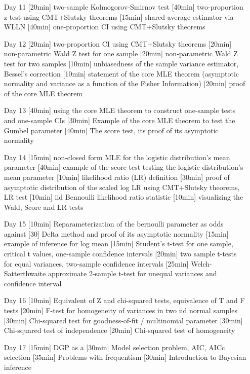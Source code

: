 \begin{enumerate}
\item[Day 11] [20min] two-sample Kolmogorov-Smirnov test [40min] two-proportion z-test using CMT+Slutsky theorems [15min] shared average estimator via WLLN [40min] one-proportion CI using CMT+Slutsky theorems

\item[Day 12] [20min] two-proportion CI using CMT+Slutsky theorems [20min] non-parametric Wald Z test for one sample [20min] non-parametric Wald Z test for two samples [10min] unbiasedness of the sample variance estimator, Bessel's correction [10min] statement of the core MLE theorem (asymptotic normality and variance as a function of the Fisher Information) [20min] proof of the core MLE theorem

\item[Day 13] [40min] using the core MLE theorem to construct one-sample tests and one-sample CIs [30min] Example of the core MLE theorem to test the Gumbel parameter [40min] The score test, its proof of its asymptotic normality 

\item[Day 14] [15min] non-closed form MLE for the logistic distribution's mean parameter [40min] example of the score test testing the logistic distribution's mean parameter [10min] likelihood ratio (LR) definition [30min] proof of asymptotic distribution of the scaled log LR using CMT+Slutsky theorems, LR test [10min] iid Bennoulli likelihood ratio statistic [10min] visualizing the Wald, Score and LR tests

\item[Day 15] [10min] Reparameterization of the bernoulli parameter as odds against [30] Delta method and proof of its asymptotic normality [15min] example of inference for log mean [15min] Student's t-test for one sample, critical t values, one-sample confidence intervals [20min] two sample t-tests for equal variances, two-sample confidence intervals [25min] Welch-Satterthwaite approximate 2-sample t-test for unequal variances and confidence interval

\item[Day 16] [10min] Equivalent of Z and chi-squared tests, equivalence of T and F tests [20min] F-test for homogeneity of variances in two iid normal samples [30min] Chi-squared test for goodness-of-fit / multinomial parameter [30min] Chi-squared test of independence [20min] Chi-squared test of homogeneity

\item[Day 17] [15min] DGP as a  [30min] Model selection problem, AIC, AICc selection [35min] Problems with frequentism [30min] Introduction to Bayesian inference


\end{enumerate}
